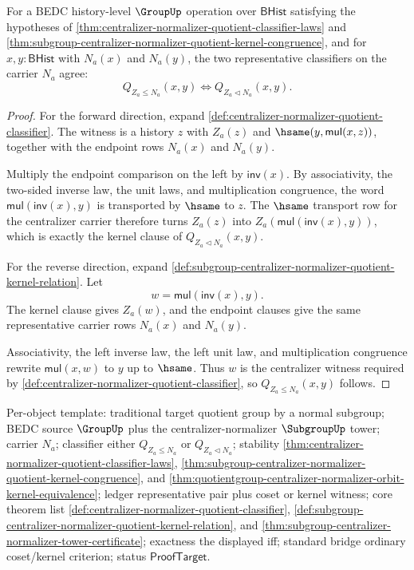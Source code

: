 \begin{theorem}
\label{thm:quotientgroup-centralizer-normalizer-orbit-kernel-equivalence}
For a BEDC history-level $\GroupUp$ operation over $\mathsf{BHist}$ satisfying
the hypotheses of
\autoref{thm:centralizer-normalizer-quotient-classifier-laws} and
\autoref{thm:subgroup-centralizer-normalizer-quotient-kernel-congruence}, and
for $x,y:\mathsf{BHist}$ with $N_a(x)$ and $N_a(y)$, the two representative
classifiers on the carrier $N_a$ agree:
$$
Q_{Z_a\leq N_a}(x,y)
\Longleftrightarrow
Q_{Z_a\triangleleft N_a}(x,y).
$$
\end{theorem}
\begin{proof}
For the forward direction, expand
\autoref{def:centralizer-normalizer-quotient-classifier}. The witness is a
history $z$ with $Z_a(z)$ and
$\hsame(y,\mathsf{mul}(x,z))$, together with the endpoint rows $N_a(x)$ and
$N_a(y)$.

Multiply the endpoint comparison on the left by $\mathsf{inv}(x)$. By
associativity, the two-sided inverse law, the unit laws, and multiplication
congruence, the word
$\mathsf{mul}(\mathsf{inv}(x),y)$ is transported by $\hsame$ to $z$. The
$\hsame$ transport row for the centralizer carrier therefore turns $Z_a(z)$
into $Z_a(\mathsf{mul}(\mathsf{inv}(x),y))$, which is exactly the kernel
clause of $Q_{Z_a\triangleleft N_a}(x,y)$.

For the reverse direction, expand
\autoref{def:subgroup-centralizer-normalizer-quotient-kernel-relation}. Let
$$
w=\mathsf{mul}(\mathsf{inv}(x),y).
$$
The kernel clause gives $Z_a(w)$, and the endpoint clauses give the same
representative carrier rows $N_a(x)$ and $N_a(y)$.

Associativity, the left inverse law, the left unit law, and multiplication
congruence rewrite $\mathsf{mul}(x,w)$ to $y$ up to $\hsame$. Thus $w$ is the
centralizer witness required by
\autoref{def:centralizer-normalizer-quotient-classifier}, so
$Q_{Z_a\leq N_a}(x,y)$ follows.
\end{proof}

Per-object template: traditional target quotient group by a normal subgroup;
BEDC source $\GroupUp$ plus the centralizer-normalizer $\SubgroupUp$ tower;
carrier $N_a$; classifier either $Q_{Z_a\leq N_a}$ or
$Q_{Z_a\triangleleft N_a}$; stability
\autoref{thm:centralizer-normalizer-quotient-classifier-laws},
\autoref{thm:subgroup-centralizer-normalizer-quotient-kernel-congruence}, and
\autoref{thm:quotientgroup-centralizer-normalizer-orbit-kernel-equivalence};
ledger representative pair plus coset or kernel witness; core theorem list
\autoref{def:centralizer-normalizer-quotient-classifier},
\autoref{def:subgroup-centralizer-normalizer-quotient-kernel-relation}, and
\autoref{thm:subgroup-centralizer-normalizer-tower-certificate}; exactness the
displayed iff; standard bridge ordinary coset/kernel criterion; status
$\mathsf{ProofTarget}$.

